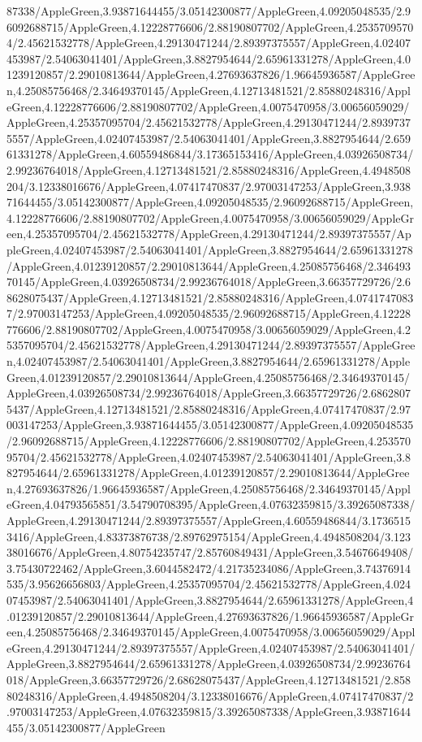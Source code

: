 {\begin{tikzternal}
87338/AppleGreen,3.93871644455/3.05142300877/AppleGreen,4.09205048535/2.96092688715/AppleGreen,4.12228776606/2.88190807702/AppleGreen,4.25357095704/2.45621532778/AppleGreen,4.29130471244/2.89397375557/AppleGreen,4.02407453987/2.54063041401/AppleGreen,3.8827954644/2.65961331278/AppleGreen,4.01239120857/2.29010813644/AppleGreen,4.27693637826/1.96645936587/AppleGreen,4.25085756468/2.34649370145/AppleGreen,4.12713481521/2.85880248316/AppleGreen,4.12228776606/2.88190807702/AppleGreen,4.0075470958/3.00656059029/AppleGreen,4.25357095704/2.45621532778/AppleGreen,4.29130471244/2.89397375557/AppleGreen,4.02407453987/2.54063041401/AppleGreen,3.8827954644/2.65961331278/AppleGreen,4.60559486844/3.17365153416/AppleGreen,4.03926508734/2.99236764018/AppleGreen,4.12713481521/2.85880248316/AppleGreen,4.4948508204/3.12338016676/AppleGreen,4.07417470837/2.97003147253/AppleGreen,3.93871644455/3.05142300877/AppleGreen,4.09205048535/2.96092688715/AppleGreen,4.12228776606/2.88190807702/AppleGreen,4.0075470958/3.00656059029/AppleGreen,4.25357095704/2.45621532778/AppleGreen,4.29130471244/2.89397375557/AppleGreen,4.02407453987/2.54063041401/AppleGreen,3.8827954644/2.65961331278/AppleGreen,4.01239120857/2.29010813644/AppleGreen,4.25085756468/2.34649370145/AppleGreen,4.03926508734/2.99236764018/AppleGreen,3.66357729726/2.68628075437/AppleGreen,4.12713481521/2.85880248316/AppleGreen,4.07417470837/2.97003147253/AppleGreen,4.09205048535/2.96092688715/AppleGreen,4.12228776606/2.88190807702/AppleGreen,4.0075470958/3.00656059029/AppleGreen,4.25357095704/2.45621532778/AppleGreen,4.29130471244/2.89397375557/AppleGreen,4.02407453987/2.54063041401/AppleGreen,3.8827954644/2.65961331278/AppleGreen,4.01239120857/2.29010813644/AppleGreen,4.25085756468/2.34649370145/AppleGreen,4.03926508734/2.99236764018/AppleGreen,3.66357729726/2.68628075437/AppleGreen,4.12713481521/2.85880248316/AppleGreen,4.07417470837/2.97003147253/AppleGreen,3.93871644455/3.05142300877/AppleGreen,4.09205048535/2.96092688715/AppleGreen,4.12228776606/2.88190807702/AppleGreen,4.25357095704/2.45621532778/AppleGreen,4.02407453987/2.54063041401/AppleGreen,3.8827954644/2.65961331278/AppleGreen,4.01239120857/2.29010813644/AppleGreen,4.27693637826/1.96645936587/AppleGreen,4.25085756468/2.34649370145/AppleGreen,4.04793565851/3.54790708395/AppleGreen,4.07632359815/3.39265087338/AppleGreen,4.29130471244/2.89397375557/AppleGreen,4.60559486844/3.17365153416/AppleGreen,4.83373876738/2.89762975154/AppleGreen,4.4948508204/3.12338016676/AppleGreen,4.80754235747/2.85760849431/AppleGreen,3.54676649408/3.75430722462/AppleGreen,3.6044582472/4.21735234086/AppleGreen,3.74376914535/3.95626656803/AppleGreen,4.25357095704/2.45621532778/AppleGreen,4.02407453987/2.54063041401/AppleGreen,3.8827954644/2.65961331278/AppleGreen,4.01239120857/2.29010813644/AppleGreen,4.27693637826/1.96645936587/AppleGreen,4.25085756468/2.34649370145/AppleGreen,4.0075470958/3.00656059029/AppleGreen,4.29130471244/2.89397375557/AppleGreen,4.02407453987/2.54063041401/AppleGreen,3.8827954644/2.65961331278/AppleGreen,4.03926508734/2.99236764018/AppleGreen,3.66357729726/2.68628075437/AppleGreen,4.12713481521/2.85880248316/AppleGreen,4.4948508204/3.12338016676/AppleGreen,4.07417470837/2.97003147253/AppleGreen,4.07632359815/3.39265087338/AppleGreen,3.93871644455/3.05142300877/AppleGreen
\end{tikzternal}}
